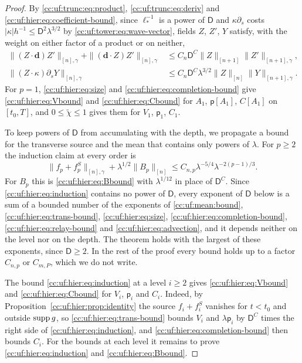 \begin{proof}
By \eqref{cc:uf:trunc:eq:product}, \eqref{cc:uf:trunc:eq:deriv} and
\eqref{cc:uf:hier:eq:coefficient-bound}, since $\ell_*^{-1}$ is a power
of $\mathsf D$ and $\kappa\partial_s$ costs
$|\kappa|h^{-1}\le\mathsf D^2\lambda^{3/2}$ by
\eqref{cc:uf:tower:eq:wave-vector}, fields $Z$, $Z'$, $Y$
satisfy, with the weight on either factor of a product or on neither,
\begin{equation}\label{cc:uf:hier:eq:advection}
 \begin{aligned}
 \|(Z\cdot\mathbf d)Z'\|_{[n],\gamma}+\|(\mathbf d\cdot Z)Z'\|_{[n],\gamma}
 &\le C_n\mathsf D^C\|Z\|_{[n+1]}\|Z'\|_{[n+1],\gamma},\\
 \|(Z\cdot\kappa)\partial_sY\|_{[n],\gamma}
 &\le C_n\mathsf D^C\lambda^{3/2}\|Z\|_{[n]}\|Y\|_{[n+1],\gamma}.
 \end{aligned}
\end{equation}
For $p=1$, \eqref{cc:uf:hier:eq:size} and
\eqref{cc:uf:hier:eq:completion-bound} give
\eqref{cc:uf:hier:eq:Vbound} and \eqref{cc:uf:hier:eq:Cbound} for
$A_1$, $\mathsf p[A_1]$, $C[A_1]$ on $[t_0,T]$, and
$0\le\widetilde\chi\le1$ gives them for $V_1$, $\mathsf p_1$, $C_1$.

To keep powers of $\mathsf D$ from accumulating with the depth, we
propagate a bound for the transverse source and the mean that contains
only powers of $\lambda$. For $p\ge2$ the induction claim at every order is
\begin{equation}\label{cc:uf:hier:eq:induction}
 \|f_p+f_p^S\|_{[n],\gamma}+\lambda^{1/2}\|B_p\|_{[n]}
 \le C_{n,p}\lambda^{-5/4}\lambda^{-2(p-1)/3}.
\end{equation}
For $B_p$ this is \eqref{cc:uf:hier:eq:Bbound} with $\lambda^{1/12}$ in
place of $\mathsf D^C$. Since \eqref{cc:uf:hier:eq:induction} contains
no power of $\mathsf D$, every exponent of $\mathsf D$ below is a sum
of a bounded number of the exponents of \eqref{cc:uf:mean:bound},
\eqref{cc:uf:hier:eq:trans-bound}, \eqref{cc:uf:hier:eq:size},
\eqref{cc:uf:hier:eq:completion-bound},
\eqref{cc:uf:hier:eq:relay-bound} and \eqref{cc:uf:hier:eq:advection},
and it depends neither on the level nor on the depth. The theorem holds
with the largest of these exponents, since $\mathsf D\ge2$. In the rest
of the proof every bound holds up to a factor $C_{n,p}$ or $C_{m,P}$,
which we do not write.

The bound \eqref{cc:uf:hier:eq:induction} at a level $i\ge2$ gives
\eqref{cc:uf:hier:eq:Vbound} and \eqref{cc:uf:hier:eq:Cbound} for $V_i$,
$\mathsf p_i$ and $C_i$. Indeed, by Proposition~\ref{cc:uf:hier:prop:identity} the source
$f_i+f_i^S$ vanishes for $t<t_0$ and outside $\operatorname{supp} g$, so
\eqref{cc:uf:hier:eq:trans-bound} bounds $V_i$ and $\lambda\mathsf p_i$
by $\mathsf D^C$ times the right side of
\eqref{cc:uf:hier:eq:induction}, and
\eqref{cc:uf:hier:eq:completion-bound} then bounds $C_i$. For the bounds
at each level it remains to prove \eqref{cc:uf:hier:eq:induction} and
\eqref{cc:uf:hier:eq:Bbound}.


\end{proof}
